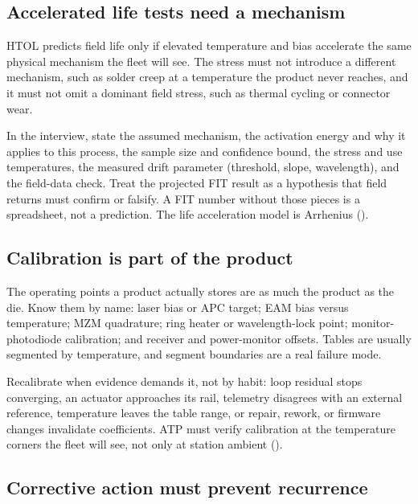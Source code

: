 \subsection{Accelerated life tests need a mechanism}

HTOL predicts field life only if elevated temperature and
bias accelerate the same physical mechanism the fleet will see. The stress
must not introduce a different mechanism, such as solder creep at a
temperature the product never reaches, and it must not omit a dominant field
stress, such as thermal cycling or connector wear.

In the interview, state the assumed mechanism, the activation energy and why
it applies to this process, the sample size and confidence bound, the stress
and use temperatures, the measured drift parameter (threshold, slope,
wavelength), and the field-data check. Treat the projected FIT
result as a hypothesis that field returns must confirm or falsify. A FIT
number without those pieces is a spreadsheet, not a prediction. The life
acceleration model is Arrhenius
().

\subsection{Calibration is part of the product}

The operating points a product actually stores are as much the product as the
die. Know them by name: laser bias or APC target;
EAM bias versus temperature; MZM quadrature;
ring heater or wavelength-lock point; monitor-photodiode
calibration; and receiver and power-monitor offsets. Tables are usually
segmented by temperature, and segment boundaries are a real failure mode.

Recalibrate when evidence demands it, not by habit: loop residual stops
converging, an actuator approaches its rail, telemetry disagrees with an
external reference, temperature leaves the table range, or repair, rework,
or firmware changes invalidate coefficients. ATP must verify
calibration at the temperature corners the fleet will see, not only at
station ambient ().

\subsection{Corrective action must prevent recurrence}

